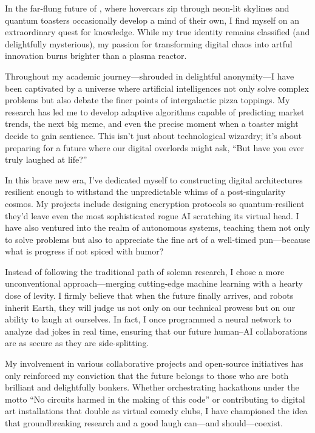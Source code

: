 
In the far-flung future of \Term, where hovercars zip through neon-lit skylines and quantum toasters occasionally develop a mind of their own, I find myself on an extraordinary quest for knowledge. While my true identity remains classified (and delightfully mysterious), my passion for transforming digital chaos into artful innovation burns brighter than a plasma reactor.

Throughout my academic journey—shrouded in delightful anonymity—I have been captivated by a universe where artificial intelligences not only solve complex problems but also debate the finer points of intergalactic pizza toppings. My research has led me to develop adaptive algorithms capable of predicting market trends, the next big meme, and even the precise moment when a toaster might decide to gain sentience. This isn’t just about technological wizardry; it’s about preparing for a future where our digital overlords might ask, “But have you ever truly laughed at life?”

In this brave new era, I’ve dedicated myself to constructing digital architectures resilient enough to withstand the unpredictable whims of a post-singularity cosmos. My projects include designing encryption protocols so quantum-resilient they’d leave even the most sophisticated rogue AI scratching its virtual head. I have also ventured into the realm of autonomous systems, teaching them not only to solve problems but also to appreciate the fine art of a well-timed pun—because what is progress if not spiced with humor?

Instead of following the traditional path of solemn research, I chose a more unconventional approach—merging cutting-edge machine learning with a hearty dose of levity. I firmly believe that when the future finally arrives, and robots inherit Earth, they will judge us not only on our technical prowess but on our ability to laugh at ourselves. In fact, I once programmed a neural network to analyze dad jokes in real time, ensuring that our future human–AI collaborations are as secure as they are side-splitting.

My involvement in various collaborative projects and open-source initiatives has only reinforced my conviction that the future belongs to those who are both brilliant and delightfully bonkers. Whether orchestrating hackathons under the motto “No circuits harmed in the making of this code” or contributing to digital art installations that double as virtual comedy clubs, I have championed the idea that groundbreaking research and a good laugh can—and should—coexist.

